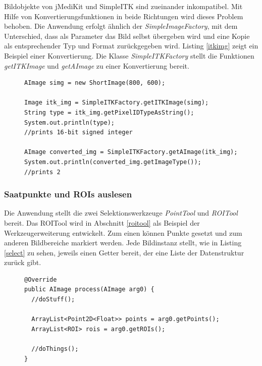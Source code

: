 Bildobjekte von jMediKit und SimpleITK sind zueinander inkompatibel. Mit Hilfe von Konvertierungsfunktionen in beide Richtungen wird dieses Problem behoben. Die Anwendung erfolgt ähnlich der \textit{SimpleImageFactory}, mit dem Unterschied, dass als Parameter das Bild selbst übergeben wird und eine Kopie als entsprechender Typ und Format zurückgegeben wird. Listing \ref{itkimg} zeigt ein Beispiel einer Konvertierung. Die Klasse \textit{SimpleITKFactory} stellt die Funktionen \textit{getITKImage} und \textit{getAImage} zu einer Konvertierung bereit.

\begin{figure}[htbp]
\begin{lstlisting}[frame=leftline]
AImage simg = new ShortImage(800, 600);

Image itk_img = SimpleITKFactory.getITKImage(simg);
String type = itk_img.getPixelIDTypeAsString();
System.out.println(type);
//prints 16-bit signed integer
		
AImage converted_img = SimpleITKFactory.getAImage(itk_img);
System.out.println(converted_img.getImageType());
//prints 2
\end{lstlisting}
\end{figure}

\subsubsection{Saatpunkte und ROIs auslesen}

Die Anwendung stellt die zwei Selektionswerkzeuge \textit{PointTool} und \textit{ROITool} bereit. Das ROITool wird in Abschnitt \ref{roitool} als Beispiel der Werkzeugerweiterung entwickelt. Zum einen können Punkte gesetzt und zum anderen Bildbereiche markiert werden. Jede Bildinstanz stellt, wie in Listing \ref{select} zu sehen, jeweils einen Getter bereit, der eine Liste der Datenstruktur zurück gibt.

\begin{figure}[htbp]
\begin{lstlisting}[frame=leftline]
@Override
public AImage process(AImage arg0) {
  //doStuff();

  ArrayList<Point2D<Float>> points = arg0.getPoints();
  ArrayList<ROI> rois = arg0.getROIs();
  
  //doThings();
}
\end{lstlisting}
\end{figure}

